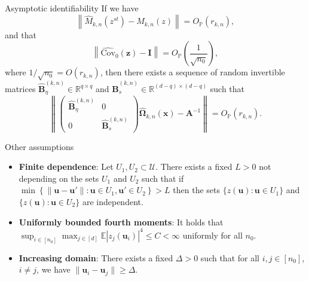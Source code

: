 \documentclass{beamer}
\begin{document}
\begin{frame}{Asymptotic identifiability}
  If we have 
  \begin{equation*}
    \label{eq:convergence_m}
    \left\|\hat M_{k, n}(z^{st}) - M_{k, n}(z)\right\|
    = O_\mathbb{P}\left(r_{k,n}\right),
  \end{equation*}
  and that
  \begin{equation*}
    \left\|\widehat{\mathrm{Cov}}_0(\bm z) - \bm I\right\|
    = O_\mathbb{P}\left(\frac{1}{\sqrt{n_0}}\right),
  \end{equation*}
  where $1/\sqrt{n_0} = O(r_{k, n})$, then there exists a sequence of random
  invertible matrices $\hat{\bm B}_\eta^{(k, n)}\in\mathbb{R}^{q\times q}$ and
  $\hat{\bm B}_s^{(k, n)}\in\mathbb{R}^{(d - q)\times (d - q)}$ such that
  \begin{equation*}
    \left\|
    \begin{pmatrix}
      \hat{\bm B}_\eta^{(k, n)} & 0 \\
      0 & \hat{\bm B}_s^{(k, n)}
    \end{pmatrix}
    \hat{\bm \Omega}_{k,n}(\bm x) - \bm A^{-1}\right\|
    = O_\mathbb{P}\left(r_{k, n}\right).
  \end{equation*}
\end{frame}


\begin{frame}{Other assumptions}
  \begin{itemize}
    \item \textbf{Finite dependence}: Let $U_1, U_2\subset\mathcal{U}$. There
    exists a fixed $L > 0$ not depending on the sets $U_1$ and $U_2$ such that
    if $\min\left\{\|\bm u - \bm u'\| : \bm u\in U_1, \bm u'\in U_2\right\} > L$
    then the sets $\{z(\bm u): \bm u\in U_1\}$ and $\{z(\bm u): \bm u\in U_2\}$
    are independent.
    \pause
    \item \textbf{Uniformly bounded fourth moments}: It holds that
    $\sup_{i\in[n_0]}\max_{j\in[d]}\mathbb{E}\left|z_j(\bm u_i)\right|^4 \leq C
    < \infty$ uniformly for all $n_0$.
    \pause
    \item \textbf{Increasing domain}: There exists a fixed $\Delta > 0$ such
    that for all $i,j\in[n_0]$,  $i\neq j$, we have $\|\bm u_i - \bm u_j\| \geq
    \Delta$.
  \end{itemize}
\end{frame}

\end{document}
